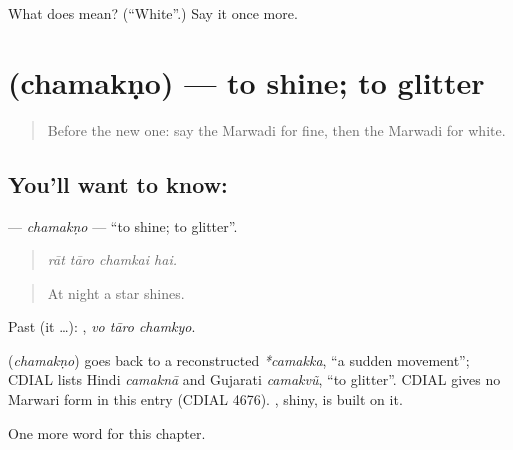 \begin{tcolorbox}[breakable,colback=teal!4,colframe=teal!35!black,title={Before you move on}]
What does  mean? (\textquotedblleft{}White\textquotedblright{}.) Say it once more.
\end{tcolorbox}
\section[\texorpdfstring{\mw{चमकणो} (chamakṇo)}{चमकणो (chamakṇo)}]{ (chamakṇo) — to shine; to glitter}

\label{lesson:MW-C229-chamakno}



\begin{quote}
Before the new one: say the Marwadi for fine, then the Marwadi for white.
\end{quote}

\subsection*{You'll want to know: }
\textbf{} — \emph{chamakṇo} — \textquotedblleft{}to shine; to glitter\textquotedblright{}.

\begin{quote}
   
\end{quote}

\begin{quote}
\emph{rāt tāro chamkai hai.}
\end{quote}

\begin{quote}
At night a star shines.
\end{quote}

Past (it …):   , \emph{vo tāro chamkyo}.

\begin{cousinweb}
\textbf{} (\emph{chamakṇo}) goes back to a reconstructed \emph{*camakka}, \textquotedblleft{}a sudden movement\textquotedblright{}; CDIAL lists Hindi \emph{camaknā} and Gujarati \emph{camakvũ}, \textquotedblleft{}to glitter\textquotedblright{}. CDIAL gives no Marwari form in this entry (CDIAL 4676). \textbf{}, shiny, is built on it.
\end{cousinweb}

\begin{grammarlens}[title={What you've built}]
One more word for this chapter.
\end{grammarlens}

